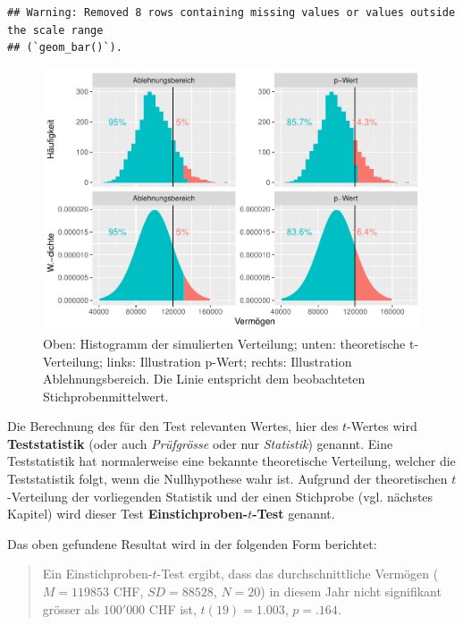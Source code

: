 \documentclass[
]{book}
\theoremstyle{definition}
\theoremstyle{definition}
\theoremstyle{definition}
\theoremstyle{definition}
\theoremstyle{remark}
\begin{document}
\begin{verbatim}
## Warning: Removed 8 rows containing missing values or values outside the scale range
## (`geom_bar()`).
\end{verbatim}

\begin{figure}

{\centering \includegraphics{aps_statistik1_files/figure-latex/exm-vermoegen-plots-sampling-theorie-1} 

}

\caption{Oben: Histogramm der simulierten Verteilung; unten: theoretische t-Verteilung; links: Illustration p-Wert; rechts: Illustration Ablehnungsbereich. Die Linie entspricht dem beobachteten Stichprobenmittelwert.}\label{fig:exm-vermoegen-plots-sampling-theorie}
\end{figure}

\label{customdef-teststatistik}{Die Berechnung des für den Test relevanten Wertes, hier des \(t\)-Wertes wird \textbf{Teststatistik} (oder auch \emph{Prüfgrösse} oder nur \emph{Statistik}) genannt.} Eine Teststatistik hat normalerweise eine bekannte theoretische Verteilung, welcher die Teststatistik folgt, wenn die Nullhypothese wahr ist. \label{customdef-t-test}{Aufgrund der theoretischen \(t\)-Verteilung der vorliegenden Statistik und der einen Stichprobe (vgl. nächstes Kapitel) wird dieser Test \textbf{Einstichproben-\(t\)-Test} genannt.}

Das oben gefundene Resultat wird in der folgenden Form berichtet:

\begin{quote}
Ein Einstichproben-\(t\)-Test ergibt, dass das durchschnittliche Vermögen (\(M = 119853\) CHF, \(SD = 88528\), \(N = 20\)) in diesem Jahr nicht signifikant grösser als \(100'000\) CHF ist, \(t(19) = 1.003\), \(p = .164\).
\end{quote}
\end{document}

